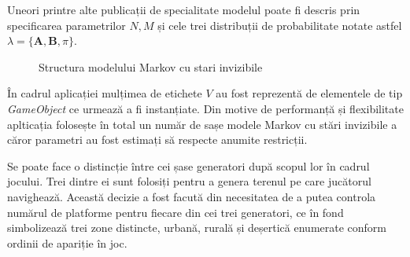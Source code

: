 Uneori printre alte publicații de specialitate modelul poate fi descris prin specificarea parametrilor $N,M$ și cele trei distribuții de probabilitate notate astfel $\lambda = \{\textbf{A},\textbf{B},\pi\}$.\par
\vspace{10mm}
\begin{figure}[H]
\centering
{}
\caption{Structura modelului Markov cu stari invizibile}
\end{figure}
\par

În cadrul aplicației mulțimea de etichete $V$ au fost reprezentă de elementele de tip \textit{GameObject} ce urmează a fi instanțiate. Din motive de performanță și flexibilitate aplticația folosește în total un număr de sașe modele Markov cu stări invizibile a căror parametri au fost estimați să respecte anumite restricții.\par

Se poate face o distincție între cei șase generatori după scopul lor în cadrul jocului. Trei dintre ei sunt folosiți pentru a genera terenul pe care jucătorul navighează. Această decizie a fost facută din necesitatea de a putea controla numărul de platforme pentru fiecare din cei trei generatori, ce în fond simbolizează trei zone distincte, urbană, rurală și deșertică enumerate conform ordinii de apariție în joc.\par

